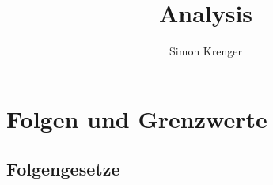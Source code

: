 \documentclass{report}
\title{Analysis}
\author{Simon Krenger}
\begin{document}
\maketitle
\chapter{Folgen und Grenzwerte}
\section{Folgengesetze}
\end{document}
